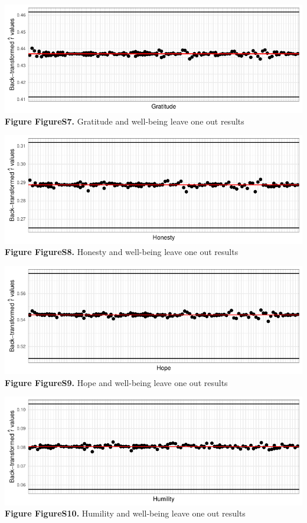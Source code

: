 \documentclass[
  letterpaper,
  DIV=11,
  numbers=noendperiod]{scrartcl}
\begin{document}
\includegraphics{SupplementaryResults_files/figure-pdf/unnamed-chunk-11-7.pdf}\textbf{Figure
FigureS7.} Gratitude and well-being leave one out results

\includegraphics{SupplementaryResults_files/figure-pdf/unnamed-chunk-11-8.pdf}\textbf{Figure
FigureS8.} Honesty and well-being leave one out results

\includegraphics{SupplementaryResults_files/figure-pdf/unnamed-chunk-11-9.pdf}\textbf{Figure
FigureS9.} Hope and well-being leave one out results

\includegraphics{SupplementaryResults_files/figure-pdf/unnamed-chunk-11-10.pdf}\textbf{Figure
FigureS10.} Humility and well-being leave one out results
\end{document}

